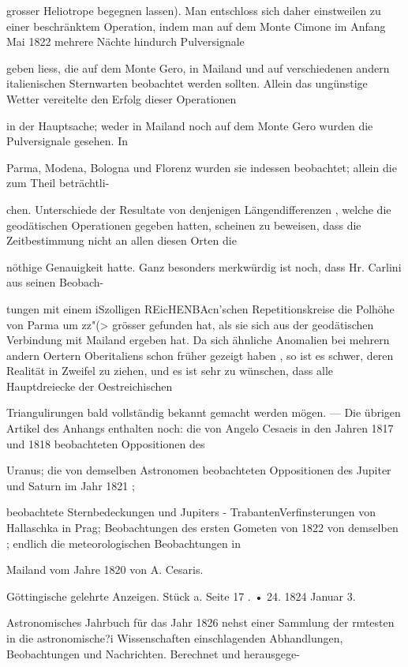 \documentclass[10pt,a4paper]{article}
\begin{document}
grosser Heliotrope begegnen lassen). Man entschloss sich daher einstweilen zu einer beschränktem Operation, indem man auf dem Monte Cimone im Anfang Mai 1822 mehrere Nächte hindurch Pulversignale

geben liess, die auf dem Monte Gero, in Mailand und auf verschiedenen andern italienischen Sternwarten beobachtet werden sollten. Allein das ungünstige Wetter vereitelte den Erfolg dieser Operationen

in der Hauptsache; weder in Mailand noch auf dem Monte Gero wurden die Pulversignale gesehen. In

Parma, Modena, Bologna und Florenz wurden sie indessen beobachtet; allein die zum Theil beträchtli-

chen. Unterschiede der Resultate von denjenigen Längendifferenzen , welche die geodätischen Operationen gegeben hatten, scheinen zu beweisen, dass die Zeitbestimmung nicht an allen diesen Orten die

nöthige Genauigkeit hatte. Ganz besonders merkwürdig ist noch, dass Hr. Carlini aus seinen Beobach-

tungen mit einem iSzolligen REicHENBAcn'schen Repetitionskreise die Polhöhe von Parma um zz"(> grösser gefunden hat, als sie sich aus der geodätischen Verbindung mit Mailand ergeben hat. Da sich ähnliche Anomalien bei mehrern andern Oertern Oberitaliens schon früher gezeigt haben , so ist es schwer, deren Realität in Zweifel zu ziehen, und es ist sehr zu wünschen, dass alle Hauptdreiecke der Oestreichischen

Triangulirungen bald vollständig bekannt gemacht werden mögen. — Die übrigen Artikel des Anhangs enthalten noch: die von Angelo Cesaeis in den Jahren 1817 und 1818 beobachteten Oppositionen des

Uranus; die von demselben Astronomen beobachteten Oppositionen des Jupiter und Saturn im Jahr 1821 ;

beobachtete Sternbedeckungen und Jupiters - TrabantenVerfinsterungen von Hallaschka in Prag; Beobachtungen des ersten Gometen von 1822 von demselben ; endlich die meteorologischen Beobachtungen in

Mailand vom Jahre 1820 von A. Cesaris.

Göttingische gelehrte Anzeigen. Stück a. Seite 17 . • 24. 1824 Januar 3.

Astronomisches Jahrbuch für das Jahr 1826 nehst einer Sammlung der rmtesten in die astronomische?i Wissenschaften einschlagenden Abhandlungen, Beobachtungen und Nachrichten. Berechnet und herausgege-
\end{document}
